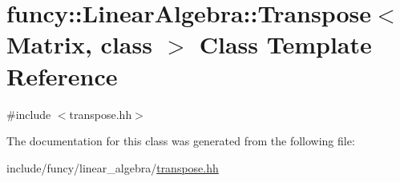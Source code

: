 \hypertarget{classfuncy_1_1LinearAlgebra_1_1Transpose}{\section{funcy\-:\-:Linear\-Algebra\-:\-:Transpose$<$ Matrix, class $>$ Class Template Reference}
\label{classfuncy_1_1LinearAlgebra_1_1Transpose}
}


{\ttfamily \#include $<$transpose.\-hh$>$}



The documentation for this class was generated from the following file\-:\begin{DoxyCompactItemize}
\item 
include/funcy/linear\-\_\-algebra/\hyperlink{transpose_8hh}{transpose.\-hh}\end{DoxyCompactItemize}

